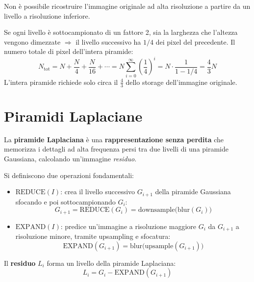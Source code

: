 \documentclass[12pt, a4paper]{report}
\begin{document}
\begin{warnbox}
Non è possibile ricostruire l'immagine originale ad alta risoluzione a partire da
un livello a risoluzione inferiore.
\end{warnbox}

\begin{notebox}
Se ogni livello è sottocampionato di un fattore 2, sia la larghezza che l'altezza
vengono dimezzate $\Rightarrow$ il livello successivo ha $1/4$ dei pixel del
precedente.  Il numero totale di pixel dell'intera piramide:
\[
  N_{\text{tot}} = N + \frac{N}{4} + \frac{N}{16} + \cdots
  = N\sum_{i=0}^{\infty}\left(\frac{1}{4}\right)^i
  = N \cdot \frac{1}{1-1/4}
  = \frac{4}{3}N
\]
L'intera piramide richiede solo circa il $\frac{4}{3}$ dello storage
dell'immagine originale.
\end{notebox}

\section{Piramidi Laplaciane}

\begin{defbox}
La \textbf{piramide Laplaciana} è una \textbf{rappresentazione senza perdita} che
memorizza i dettagli ad alta frequenza persi tra due livelli di una piramide
Gaussiana, calcolando un'immagine \emph{residuo}.
\end{defbox}

Si definiscono due operazioni fondamentali:

\begin{itemize}
  \item $\mathrm{REDUCE}(I)$: crea il livello successivo $G_{i+1}$ della piramide
        Gaussiana sfocando e poi sottocampionando $G_i$:
        \[
          G_{i+1} = \mathrm{REDUCE}(G_i)
          = \mathrm{downsample}\!\bigl(\mathrm{blur}(G_i)\bigr)
        \]

  \item $\mathrm{EXPAND}(I)$: predice un'immagine a risoluzione maggiore $G_i$ da
        $G_{i+1}$ a risoluzione minore, tramite upsampling e sfocatura:
        \[
          \mathrm{EXPAND}(G_{i+1})
          = \mathrm{blur}\!\bigl(\mathrm{upsample}(G_{i+1})\bigr)
        \]
\end{itemize}

Il \textbf{residuo} $L_i$ forma un livello della piramide Laplaciana:
\[
  L_i = G_i - \mathrm{EXPAND}(G_{i+1})
\]
\end{document}

